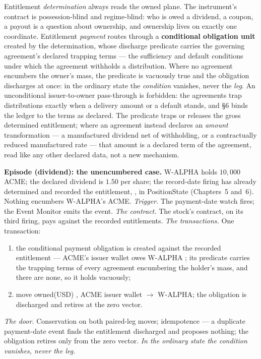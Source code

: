 Entitlement \emph{determination} always reads the owned plane. The
instrument's contract is possession-blind and regime-blind: who is owed a
dividend, a coupon, a payout is a question about ownership, and ownership
lives on exactly one coordinate. Entitlement \emph{payment} routes through a
\textbf{conditional obligation unit} created by the determination, whose
discharge predicate carries the governing agreement's declared trapping terms
--- the sufficiency and default conditions under which the agreement withholds
a distribution. Where no agreement encumbers the owner's mass, the predicate
is vacuously true and the obligation discharges at once: in the ordinary state
the \emph{condition} vanishes, never the \emph{leg}. An unconditional
issuer-to-owner pass-through is forbidden: the agreements trap distributions
exactly when a delivery amount or a default stands, and \S6 binds the ledger
to the terms as declared. The predicate traps or releases the gross determined
entitlement; where an agreement instead declares an \emph{amount} transformation
--- a manufactured dividend net of withholding, or a contractually reduced
manufactured rate --- that amount is a declared term of the agreement, read like
any other declared data, not a new mechanism.

\medskip\noindent\textbf{Episode (dividend): the unencumbered case.}
W-ALPHA holds $10{,}000$ ACME; the declared dividend is $1.50$ per share; the
record-date firing has already determined and recorded the entitlement,
, in PositionState (Chapters~5 and~6). Nothing encumbers
W-ALPHA's ACME.
\emph{Trigger.} The payment-date watch fires; the Event Monitor emits the
event.
\emph{The contract.} The stock's contract, on its third firing, pays against
the recorded entitlements.
\emph{The transactions.} One transaction:
\begin{enumerate}[label=(\arabic*),nosep]
\item the conditional payment obligation is created against the recorded
entitlement --- ACME's issuer wallet owes W-ALPHA ; its predicate
carries the trapping terms of every agreement encumbering the holder's mass,
and there are none, so it holds vacuously;
\item move owned(USD) , ACME issuer wallet $\to$ W-ALPHA; the
obligation is discharged and retires at the zero vector.
\end{enumerate}
\emph{The door.} Conservation on both paired-leg moves; idempotence --- a
duplicate payment-date event finds the entitlement discharged and proposes
nothing; the obligation retires only from the zero vector.
\emph{In the ordinary state the condition vanishes, never the leg.}

